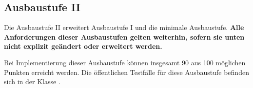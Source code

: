 \subsection{Ausbaustufe II}

Die Ausbaustufe II erweitert Ausbaustufe I und die minimale
Ausbaustufe. \textbf{Alle Anforderungen dieser Ausbaustufen gelten
  weiterhin, sofern sie unten nicht explizit ge\"andert oder erweitert
  werden.}

Bei Implementierung dieser Ausbaustufe k\"onnen insgesamt 90 aus 100
m\"oglichen Punkten erreicht werden. Die \"offentlichen Testf\"alle
f\"ur diese Ausbaustufe befinden sich in der Klasse \texttt{\testLvB}.
